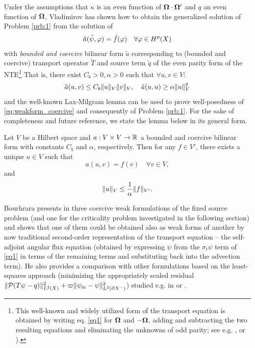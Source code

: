 Under the assumptions that $\kappa$ is an even function of $\bomega\cdot\bomega'$ and $q$ an even function of $\bomega$,
Vladimirov \cite{Vladimirov} has shown how to obtain the generalized solution of Problem \ref{prb:1} from the solution
of
\begin{equation}\label{eq:weakform_coercive}
	\tilde{a}(\tilde{\psi}, \varphi) = \tilde{f}(\varphi) \quad \forall \varphi\in \Hp(X)
\end{equation} 
with \textit{bounded and coercive} bilinear form $\tilde{a}$ corresponding to (bounded and coercive) transport operator
$\tilde{T}$ and source term $\tilde{q}$ of the even parity form of the NTE\footnote{This well-known and widely utilized
form of the transport equation is obtained by writing eq. \eqref{eq1} for $\bomega$ and $-\bomega$, adding and
subtracting the two resulting equations and eliminating the unknowns of odd parity; see e.g. \cite[Chap.
II]{Azmy1}, \cite[Sec. 9.11]{Stacey1} or \cite[Chap. XX]{DautrayLions}).} That is, there exist $C_b > 0, \alpha > 0$
such that $\forall u,v \in V$:
$$
	\tilde{a}(u,v) \leq C_b \norm[{V}]{u}\norm[{V}]{v},
	\quad \tilde{a}(u, u) \geq \alpha \norm[{V}]{u}^2
$$
and the well-known Lax-Milgram lemma can be used to prove well-posedness of \eqref{eq:weakform_coercive} and
consequently of Problem \ref{prb:1}. For the sake of completeness and future reference, we state the lemma below in
its general form.
\begin{lemma}\label{lem:lax-milgram}
	Let $V$ be a Hilbert space and $a : V\times V \to \R$ a bounded and coercive bilinear form with constants $C_b$ and
	$\alpha$, respectively.
	Then for any $f \in V'$, there exists a unique $u\in V$ such that
	\begin{equation}\label{eq:laxmilgram}
		a(u,v) = f(v) \quad \forall v\in V,
	\end{equation}
	and
	$$
		\norm[V]{u} \leq \frac{1}{\alpha}\norm[V']{f}.
	$$
\end{lemma}



Bourhrara presents in \cite{Bourhrara2} three coercive weak formulations of the fixed source problem (and
one for the criticality problem investigated in the following section) and shows that one of them could be obtained
also as weak forms of another by now traditional second-order representation of the transport equation --  the
self-adjoint angular flux equation (obtained by expressing $\psi$ from the $\sigma_t\psi$ term of \eqref{eq1} in terms 
of the remaining terms and substituting back into the advection term). He also provides a comparison with other 
formulations based on the least-squares approach (minimizing the appropriately scaled residual 
\mbox{$\norm[{\Lp[2](X)}]{\mathcal{P}(T \psi - q)}^2 + \varpi\norm[{\Lp[2](\pX[-])}]{\psi_{\text{in}} - \psi}^2$}) 
studied e.g. in \cite{Manteuffel} or \cite{Agoshkov}. 


